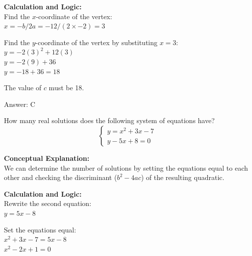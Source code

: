 \documentclass[11pt,paper=a4,answers]{exam}
\begin{document}
\begin{questions}
\begin{solution}
\vspace{20pt}

\textbf{Calculation and Logic:} \\
Find the $x$-coordinate of the vertex: \\
$x = -b / 2a = -12 / (2 \times -2) = 3$

\vspace{10pt}

Find the $y$-coordinate of the vertex by substituting $x = 3$: \\
$y = -2(3)^2 + 12(3)$ \\
$y = -2(9) + 36$ \\
$y = -18 + 36 = 18$

\vspace{10pt}

The value of $c$ must be 18.

\vspace{25pt}

Answer: \colorbox{yellow!100}{C}
\end{solution}

\vspace{40pt}

\question
How many real solutions does the following system of equations have?
\[ \begin{cases} y = x^2 + 3x - 7 \\ y - 5x + 8 = 0 \end{cases} \]

\begin{solution}
\textbf{Conceptual Explanation:} \\
We can determine the number of solutions by setting the equations equal to each other and checking the discriminant ($b^2 - 4ac$) of the resulting quadratic.

\vspace{20pt}

\textbf{Calculation and Logic:} \\
Rewrite the second equation: \\
$y = 5x - 8$

\vspace{10pt}

Set the equations equal: \\
$x^2 + 3x - 7 = 5x - 8$ \\
$x^2 - 2x + 1 = 0$

\vspace{10pt}


\end{solution}
\end{questions}
\end{document}

